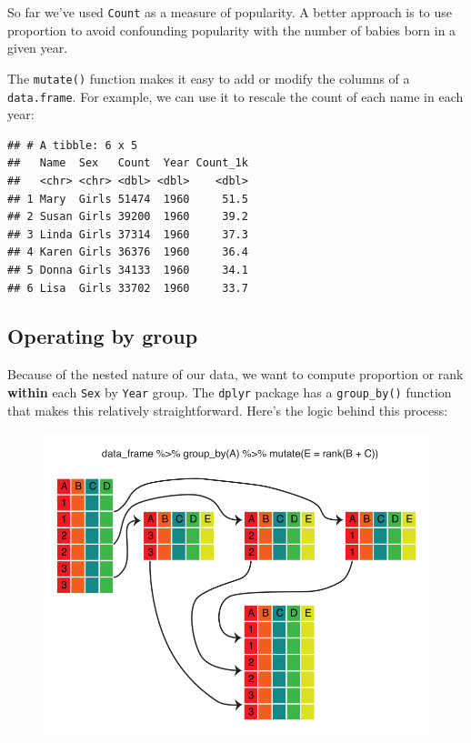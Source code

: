\documentclass[]{book}
\newenvironment{Shaded}{\begin{snugshade}}{\end{snugshade}}
\newcommand{\KeywordTok}[1]{\textcolor[rgb]{0.13,0.29,0.53}{\textbf{#1}}}
\newcommand{\DataTypeTok}[1]{\textcolor[rgb]{0.13,0.29,0.53}{#1}}
\newcommand{\DecValTok}[1]{\textcolor[rgb]{0.00,0.00,0.81}{#1}}
\newcommand{\StringTok}[1]{\textcolor[rgb]{0.31,0.60,0.02}{#1}}
\newcommand{\OperatorTok}[1]{\textcolor[rgb]{0.81,0.36,0.00}{\textbf{#1}}}
\newcommand{\NormalTok}[1]{#1}
\begin{document}
So far we've used \texttt{Count} as a measure of popularity. A better
approach is to use proportion to avoid confounding popularity with the
number of babies born in a given year.

The \texttt{mutate()} function makes it easy to add or modify the
columns of a \texttt{data.frame}. For example, we can use it to rescale
the count of each name in each year:

\begin{Shaded}
\end{Shaded}

\begin{verbatim}
## # A tibble: 6 x 5
##   Name  Sex   Count  Year Count_1k
##   <chr> <chr> <dbl> <dbl>    <dbl>
## 1 Mary  Girls 51474  1960     51.5
## 2 Susan Girls 39200  1960     39.2
## 3 Linda Girls 37314  1960     37.3
## 4 Karen Girls 36376  1960     36.4
## 5 Donna Girls 34133  1960     34.1
## 6 Lisa  Girls 33702  1960     33.7
\end{verbatim}

\subsection{Operating by group}\label{operating-by-group}

Because of the nested nature of our data, we want to compute proportion
or rank \textbf{within} each \texttt{Sex} by \texttt{Year} group. The
\texttt{dplyr} package has a \texttt{group\_by()} function that makes
this relatively straightforward. Here's the logic behind this process:

\begin{figure}
\centering
\includegraphics{R/Rintro/images/mutate_group_by.png}
\caption{}
\end{figure}
\end{document}
